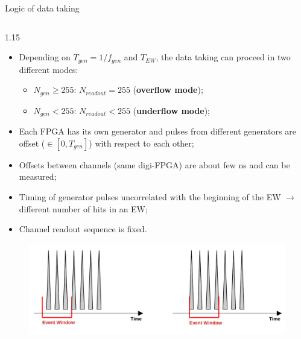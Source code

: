 \documentclass{beamer}
\begin{document}
\begin{frame}{Logic of data taking}
\begin{columns}
   \begin{column}{1.15\framewidth} 
         \setlength{\leftmargini}{1.3em}
         \vspace{-3mm}
        \begin{itemize}
         \item Depending on $T_{gen}=1/f_{gen}$ and $T_{EW}$, the data taking can proceed in two different modes:
  \begin{itemize}
  \item $N_{gen}\geq255$: $N_{readout}=255$ (\textbf{overflow mode});
    \item $N_{gen}<255$: $N_{readout}<255$ (\textbf{underflow mode});
  \end{itemize}
      \item Each FPGA has its own generator and pulses from different generators are offset ($\in [0 ,T_{gen}]$) with respect to each other;
      \item Offsets between channels (same digi-FPGA) are about few ns and can be measured;
      \item Timing of generator pulses uncorrelated with the beginning of the EW $\rightarrow$ different number of hits in an EW;
      \item Channel readout sequence is fixed.
  \end{itemize}
  \vspace{-4mm}
              \begin{figure}[H]
          \centering
          \includegraphics[width=0.8 \framewidth]{figures/png/finalimg.png}
          \label{fig:enter-label} 
      \end{figure}
   \end{column}
   \end{columns}
    \end{frame}
\end{document}
